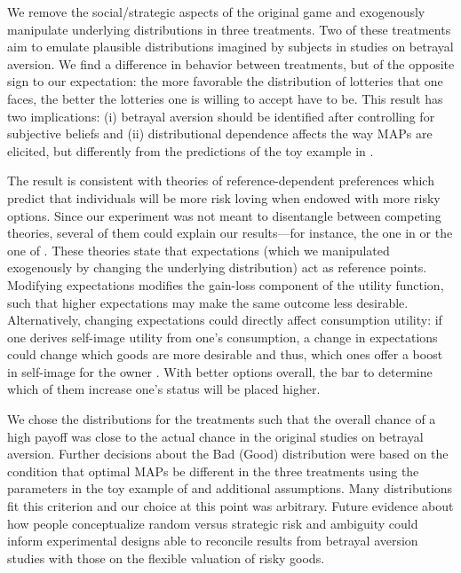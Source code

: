 We remove the social/strategic aspects of the original game and exogenously manipulate underlying distributions in three treatments.
Two of these treatments aim to emulate plausible distributions imagined by subjects in studies on betrayal aversion.
%
We find a difference in behavior between treatments, but of the opposite sign to our expectation: the more favorable the distribution of lotteries that one faces, the better the lotteries one is willing to accept have to be.
This result has two implications: (i) betrayal aversion should be identified after controlling for subjective beliefs and (ii) distributional dependence affects the way MAPs are elicited, but differently from the predictions of the toy example in \cite{Li2020a}.

The result is consistent with theories of reference-dependent preferences which predict that individuals will be more risk loving when endowed with more risky options.
Since our experiment was not meant to disentangle between competing theories, several of them could explain our results---for instance, the one in \cite{Koszegi2006,Koszegi2007} or the one of \cite{Wenner2015}.
These theories state that expectations (which we manipulated exogenously by changing the underlying distribution) act as reference points.
Modifying expectations modifies the gain-loss component of the utility function, such that higher expectations may make the same outcome less desirable.
Alternatively, changing expectations could directly affect consumption utility: if one derives self-image utility from one's consumption, a change in expectations could change which goods are more desirable and thus, which ones offer a boost in self-image for the owner \citep{Strahilevitz1998,Marzilli2011}.
With better options overall, the bar to determine which of them increase one's status will be placed higher.

We chose the distributions for the treatments such that the overall chance of a high payoff was close to the actual chance in the original studies on betrayal aversion.
Further decisions about the Bad (Good) distribution were based on the condition that optimal MAPs be different in the three treatments using the parameters in the toy example of \cite{Li2020a} and additional assumptions.
Many distributions fit this criterion and our choice at this point was arbitrary.
Future evidence about how people conceptualize random versus strategic risk and ambiguity could inform experimental designs able to reconcile results from betrayal aversion studies with those on the flexible valuation of risky goods.


